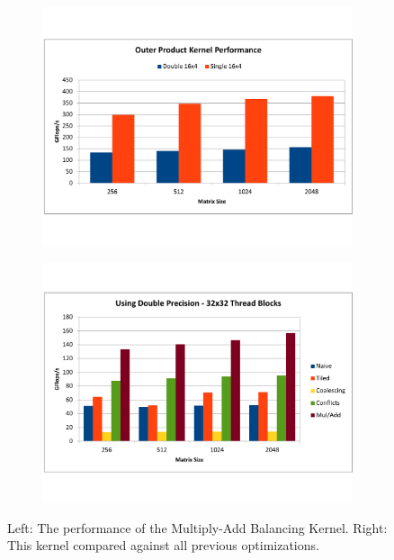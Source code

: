 \documentclass[paper=a4, fontsize=11pt]{scrartcl} %
\numberwithin{equation}{section} %
\numberwithin{figure}{section} %
\numberwithin{table}{section} %
\begin{document}
\begin{figure} [h]
\centering
\begin{subfigure}{.5\textwidth}
  \centering
  \includegraphics[width=\linewidth]{figures/outer.pdf}
  \label{fig:balancing}
\end{subfigure}%
\begin{subfigure}{.5\textwidth}
  \centering
  \includegraphics[width=\linewidth]{figures/outer_vs_conflicts.pdf}
  \label{fig:balancing_vs_conflicts}
\end{subfigure}
\caption{Left: The performance of the Multiply-Add Balancing Kernel. Right: This kernel compared against all previous optimizations.}
\label{fig:multi6}
\end{figure}
\end{document}
